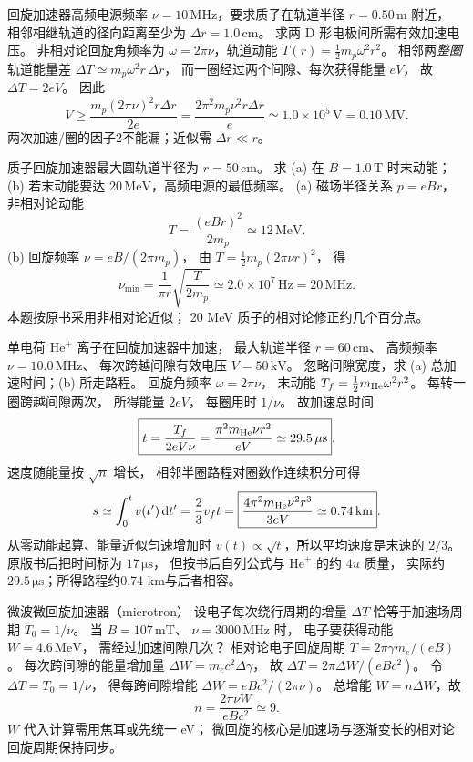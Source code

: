 回旋加速器高频电源频率
$\nu=10\,\mathrm{MHz}$，要求质子在轨道半径
$r=0.50\,\mathrm m$ 附近，
相邻相继轨道的径向距离至少为
$\Delta r=1.0\,\mathrm{cm}$。
求两 D 形电极间所需有效加速电压。
\exsolution
非相对论回旋角频率为
$\omega=2\pi\nu$，轨道动能
$T(r)=\tfrac12m_p\omega^2r^2$。
相邻两\emph{整圈}轨道能量差
$\Delta T\simeq m_p\omega^2r\,\Delta r$，
而一圈经过两个间隙、每次获得能量 $eV$，
故 $\Delta T=2eV$。
因此
\[
\boxed{V\ge
\frac{m_p(2\pi\nu)^2r\Delta r}{2e}
=\frac{2\pi^2m_p\nu^2r\Delta r}{e}
\simeq1.0\times10^5\,\mathrm V=0.10\,\mathrm{MV}}.
\]
\excheck 两次加速/圈的因子2不能漏；近似需 $\Delta r\ll r$。

质子回旋加速器最大圆轨道半径为 $r=50\,\mathrm{cm}$。
求 (a) 在 $B=1.0\,\mathrm T$ 时末动能；
(b) 若末动能要达 $20\,\mathrm{MeV}$，高频电源的最低频率。
\exsolution
(a) 磁场半径关系 $p=eBr$，
非相对论动能
\[
\boxed{T=\frac{(eBr)^2}{2m_p}
\simeq12\,\mathrm{MeV}}.
\]
(b) 回旋频率 $\nu=eB/(2\pi m_p)$，
由 $T=\frac12m_p(2\pi\nu r)^2$，
得
\[
\boxed{\nu_{\min}=\frac1{\pi r}
\sqrt{\frac{T}{2m_p}}
\simeq2.0\times10^7\,\mathrm{Hz}=20\,\mathrm{MHz}}.
\]
\excheck 本题按原书采用非相对论近似；
20 MeV 质子的相对论修正约几个百分点。

单电荷 $\mathrm{He}^+$ 离子在回旋加速器中加速，
最大轨道半径 $r=60\,\mathrm{cm}$、
高频频率 $\nu=10.0\,\mathrm{MHz}$、
每次跨越间隙有效电压 $V=50\,\mathrm{kV}$。
忽略间隙宽度，求 (a) 总加速时间；(b) 所走路程。
\exsolution
回旋角频率 $\omega=2\pi\nu$，
末动能 $T_f=\frac12m_{\rm He}\omega^2r^2$。
每转一圈跨越间隙两次，
所得能量 $2eV$，
每圈用时 $1/\nu$。
故加速总时间
\[
\boxed{t=\frac{T_f}{2eV\nu}
=\frac{\pi^2m_{\rm He}\nu r^2}{eV}
\simeq29.5\,\mathrm{\mu s}}.
\]
速度随能量按 $\sqrt n$ 增长，
相邻半圈路程对圈数作连续积分可得
\[
s\simeq\int_0^t v(t')\,\mathrm dt'
=\frac23v_ft
=\boxed{\frac{4\pi^2m_{\rm He}\nu^2r^3}{3eV}
\simeq0.74\,\mathrm{km}}.
\]
\excheck 从零动能起算、能量近似匀速增加时
$v(t)\propto\sqrt t$，所以平均速度是末速的 $2/3$。
原版书后把时间标为 $17\,\mathrm{\mu s}$，
但按书后自列公式与 $\mathrm{He}^+$ 的约 $4u$ 质量，
实际约 $29.5\,\mathrm{\mu s}$；所得路程约0.74 km与后者相容。

微波微回旋加速器（microtron）
设电子每次绕行周期的增量
$\Delta T$ 恰等于加速场周期
$T_0=1/\nu$。
当 $B=107\,\mathrm{mT}$、
$\nu=3000\,\mathrm{MHz}$ 时，
电子要获得动能 $W=4.6\,\mathrm{MeV}$，
需经过加速间隙几次？
\exsolution
相对论电子回旋周期
$T=2\pi\gamma m_e/(eB)$。
每次跨间隙的能量增加量
$\Delta W=m_ec^2\Delta\gamma$，
故
$\Delta T=2\pi\Delta W/(eBc^2)$。
令 $\Delta T=T_0=1/\nu$，
得每跨间隙增能
$\Delta W=eBc^2/(2\pi\nu)$。
总增能 $W=n\Delta W$，故
\[
\boxed{n=\frac{2\pi\nu W}{eBc^2}\simeq9}.
\]
\excheck $W$ 代入计算需用焦耳或先统一 eV；
微回旋的核心是加速场与逐渐变长的相对论回旋周期保持同步。

